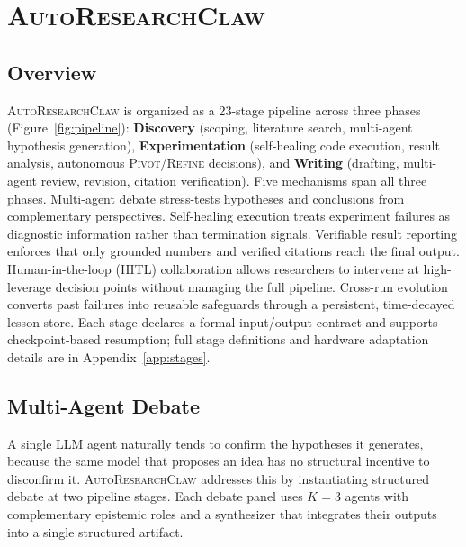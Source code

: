 \documentclass{llmxive}
\providecommand{\system}{\textsc{AutoResearchClaw}}
\begin{document}
\section{\system{}}
\label{sec:method}
\vspace{-0.5em}

\vspace{-0.3em}
\subsection{Overview}
\label{sec:overview}
\vspace{-0.3em}

\system{} is organized as a 23-stage pipeline across three phases (Figure~\ref{fig:pipeline}):
\textbf{Discovery} (scoping, literature search, multi-agent hypothesis generation),
\textbf{Experimentation} (self-healing code execution, result analysis, autonomous \textsc{Pivot}/\textsc{Refine} decisions),
and \textbf{Writing} (drafting, multi-agent review, revision, citation verification).
Five mechanisms span all three phases.
Multi-agent debate stress-tests hypotheses and conclusions from complementary perspectives.
Self-healing execution treats experiment failures as diagnostic information rather than termination signals.
Verifiable result reporting enforces that only grounded numbers and verified citations reach the final output.
Human-in-the-loop (HITL) collaboration allows researchers to intervene at high-leverage decision points without managing the full pipeline.
Cross-run evolution converts past failures into reusable safeguards through a persistent, time-decayed lesson store.
Each stage declares a formal input/output contract and supports checkpoint-based resumption; full stage definitions and hardware adaptation details are in Appendix~\ref{app:stages}.

\vspace{-0.3em}
\subsection{Multi-Agent Debate}
\label{sec:debate}
\vspace{-0.3em}

A single LLM agent naturally tends to confirm the hypotheses it generates, because the same model that proposes an idea has no structural incentive to disconfirm it.
\system{} addresses this by instantiating structured debate at two pipeline stages.
Each debate panel uses $K{=}3$ agents with complementary epistemic roles and a synthesizer that integrates their outputs into a single structured artifact.
\end{document}
